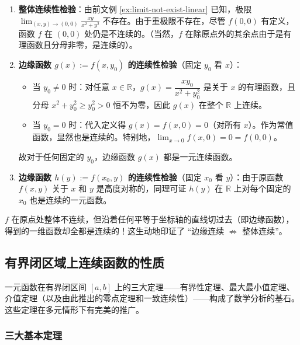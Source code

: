\documentclass[lang=cn,11pt]{elegantbook}
\begin{document}
\begin{solution}
\begin{enumerate}
  \item \textbf{整体连续性检验}：由前文例 \ref{ex:limit-not-exist-linear} 已知，极限 $\displaystyle\lim_{(x,y)\to(0,0)}\frac{xy}{x^2+y^2}$ 不存在。由于重极限不存在，尽管 $f(0,0)$ 有定义，函数 $f$ 在 $(0,0)$ 处仍是不连续的。（当然，$f$ 在除原点外的其余点由于是有理函数且分母非零，是连续的）。
  
  \item \textbf{边缘函数 $g(x):=f(x,y_0)$ 的连续性检验}（固定 $y_0$ 看 $x$）：
  \begin{itemize}
    \item 当 $y_0 \neq 0$ 时：对任意 $x\in\mathbb{R}$，$g(x)=\dfrac{xy_0}{x^2+y_0^2}$ 是关于 $x$ 的有理函数，且分母 $x^2+y_0^2 \geq y_0^2 > 0$ 恒不为零，因此 $g(x)$ 在整个 $\mathbb{R}$ 上连续。
    \item 当 $y_0=0$ 时：代入定义得 $g(x)=f(x,0)=0$（对所有 $x$）。作为常值函数，显然也是连续的。特别地，$\displaystyle\lim_{x\to 0}f(x,0)=0=f(0,0)$。
  \end{itemize}
  故对于任何固定的 $y_0$，边缘函数 $g(x)$ 都是一元连续函数。

  \item \textbf{边缘函数 $h(y):=f(x_0,y)$ 的连续性检验}（固定 $x_0$ 看 $y$）：由于原函数 $f(x,y)$ 关于 $x$ 和 $y$ 是高度对称的，同理可证 $h(y)$ 在 $\mathbb{R}$ 上对每个固定的 $x_0$ 也是连续的一元函数。
\end{enumerate}
\begin{note}
$f$ 在原点处整体不连续，但沿着任何平等于坐标轴的直线切过去（即边缘函数），得到的一维函数却全都是连续的！这生动地印证了 ``边缘连续 $\not\Rightarrow$ 整体连续''。
\end{note}

\end{solution}


\subsection{有界闭区域上连续函数的性质}

一元函数在有界闭区间 $[a,b]$ 上的三大定理——有界性定理、最大最小值定理、介值定理（以及由此推出的零点定理和一致连续性）——构成了数学分析的基石。这些定理在多元情形下有完美的推广。


\subsubsection{三大基本定理}
\end{document}
